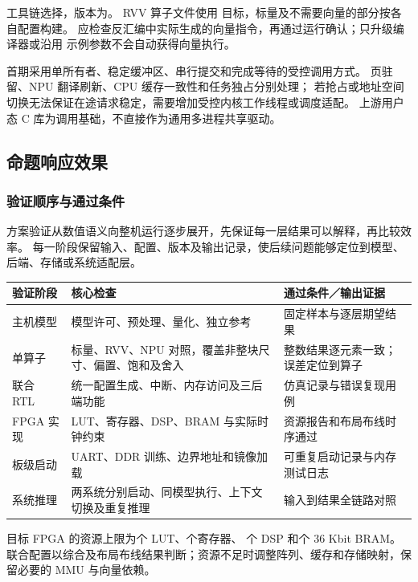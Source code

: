 工具链选择\Toolchain{}，版本为\ToolchainVersion{}。
RVV 算子文件使用 \texttt{\RvvCompileISA{}} 目标，标量及不需要向量的部分按各自配置构建。
应检查反汇编中实际生成的向量指令，再通过运行确认；只升级编译器或沿用 \texttt{\ScalarCompileISA{}} 示例参数不会自动获得向量执行。\cite{gcc,rvv}

\AcceleratorName{}首期采用单所有者、稳定缓冲区、串行提交和完成等待的受控调用方式。
页驻留、NPU 翻译刷新、CPU 缓存一致性和任务独占分别处理；
若抢占或地址空间切换无法保证在途请求稳定，需要增加受控内核工作线程或调度适配。
上游用户态 C 库为调用基础，不直接作为通用多进程共享驱动。\cite{gemminilib}

\subsection{命题响应效果}
\subsubsection{验证顺序与通过条件}
方案验证从数值语义向整机运行逐步展开，先保证每一层结果可以解释，再比较效率。
每一阶段保留输入、配置、版本及输出记录，使后续问题能够定位到模型、后端、存储或系统适配层。

\par{\small\renewcommand{\arraystretch}{1.2}
\noindent\begin{tabularx}{\linewidth}{@{}P{.19\linewidth}YP{.32\linewidth}@{}}
\toprule
验证阶段 & 核心检查 & 通过条件／输出证据\\
\midrule
主机模型 & 模型许可、预处理、量化、独立参考 & 固定样本与逐层期望结果\\
单算子 & 标量、RVV、NPU 对照，覆盖非整块尺寸、偏置、饱和及舍入 & 整数结果逐元素一致；误差定位到算子\\
联合 RTL & 统一配置生成、中断、内存访问及三后端功能 & \SimulationTool{}仿真记录与错误复现用例\\
FPGA 实现 & LUT、寄存器、DSP、BRAM 与实际时钟约束 & \FPGATool{}资源报告和布局布线时序通过\\
板级启动 & UART、DDR 训练、边界地址和镜像加载 & 可重复启动记录与内存测试日志\\
系统推理 & 两系统分别启动、同模型执行、上下文切换及重复推理 & 输入到结果全链路对照\\
\bottomrule
\end{tabularx}\par}

目标 FPGA 的资源上限为\FPGALutLimit{}个 LUT、\FPGARegisterLimit{}个寄存器、
\FPGADspLimit{}个 DSP 和\FPGABramLimit{}个 36 Kbit BRAM。
联合配置以综合及布局布线结果判断；资源不足时调整阵列、缓存和存储映射，保留必要的 MMU 与向量依赖。\cite{amd}

